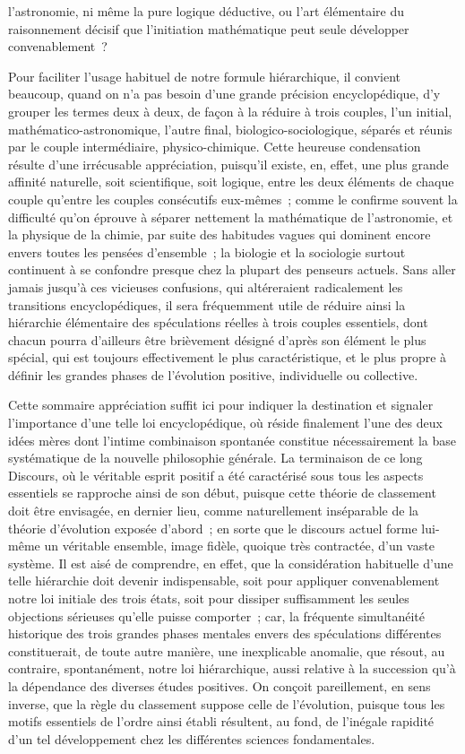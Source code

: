 \documentclass[french,twoside]{book} %
\begin{document}
l’astronomie, ni même la pure logique déductive, ou l’art élémentaire du raisonnement décisif que l’initiation mathématique peut seule développer convenablement ?\par
Pour faciliter l’usage habituel de notre formule hiérarchique, il convient beaucoup, quand on n’a pas besoin d’une grande précision encyclopédique, d’y grouper les termes deux à deux, de façon à la réduire à trois couples, l’un initial, mathématico-astronomique, l’autre final, biologico-sociologique, séparés et réunis par le couple intermédiaire, physico-chimique. Cette heureuse condensation résulte d’une irrécusable appréciation, puisqu’il existe, en, effet, une plus grande affinité naturelle, soit scientifique, soit logique, entre les deux éléments de chaque couple qu’entre les couples consécutifs eux-mêmes ; comme le confirme souvent la difficulté qu’on éprouve à séparer nettement la mathématique de l’astronomie, et la physique de la chimie, par suite des habitudes vagues qui dominent encore envers toutes les pensées d’ensemble ; la biologie et la sociologie surtout continuent à se confondre presque chez la plupart des penseurs actuels. Sans aller jamais jusqu’à ces vicieuses confusions, qui altéreraient radicalement les transitions encyclopédiques, il sera fréquemment utile de réduire ainsi la hiérarchie élémentaire des spéculations réelles à trois couples essentiels, dont chacun pourra d’ailleurs être brièvement désigné d’après son élément le plus spécial, qui est toujours effectivement le plus caractéristique, et le plus propre à définir les grandes phases de l’évolution positive, individuelle ou collective.\par
Cette sommaire appréciation suffit ici pour indiquer la destination et signaler l’importance d’une telle loi encyclopédique, où réside finalement l’une des deux idées mères dont l’intime combinaison spontanée constitue nécessairement la base systématique de la nouvelle philosophie générale. La terminaison de ce long Discours, où le véritable esprit positif a été caractérisé sous tous les aspects essentiels se rapproche ainsi de son début, puisque cette théorie de classement doit être envisagée, en dernier lieu, comme naturellement inséparable de la théorie d’évolution exposée d’abord ; en sorte que le discours actuel forme lui-même un véritable ensemble, image fidèle, quoique très contractée, d’un vaste système. Il est aisé de comprendre, en effet, que la considération habituelle d’une telle hiérarchie doit devenir indispensable, soit pour appliquer convenablement notre loi initiale des trois états, soit pour dissiper suffisamment les seules objections sérieuses qu’elle puisse comporter ; car, la fréquente simultanéité historique des trois grandes phases mentales envers des spéculations différentes constituerait, de toute autre manière, une inexplicable anomalie, que résout, au contraire, spontanément, notre loi hiérarchique, aussi relative à la succession qu’à la dépendance des diverses études positives. On conçoit pareillement, en sens inverse, que la règle du classement suppose celle de l’évolution, puisque tous les motifs essentiels de l’ordre ainsi établi résultent, au fond, de l’inégale rapidité d’un tel développement chez les différentes sciences fondamentales.\par
\end{document}
